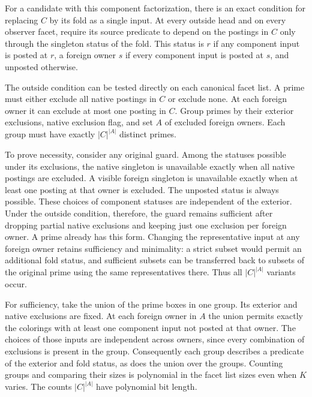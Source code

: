 For a candidate with this component factorization,
there is an exact condition for replacing $C$ by its
fold as a single input. At every outside head and on
every observer facet, require its source predicate
to depend on the postings in $C$ only through the
singleton status of the fold. This status is $r$ if
any component input is posted at $r$, a foreign
owner $s$ if every component input is posted at $s$,
and unposted otherwise.

The outside condition can be tested directly on each
canonical facet list. A prime must either exclude all
native postings in $C$ or exclude none. At each foreign
owner it can exclude at most one posting in $C$.
Group primes by their exterior exclusions, native
exclusion flag, and set $A$ of excluded foreign owners.
Each group must have exactly $|C|^{|A|}$ distinct primes.

To prove necessity, consider any original guard.
Among the statuses possible under its exclusions, the
native singleton is unavailable exactly when all native
postings are excluded. A visible foreign singleton is
unavailable exactly when at least one posting at that
owner is excluded. The unposted status is always
possible. These choices of component statuses are
independent of the exterior. Under the outside
condition, therefore, the guard remains sufficient
after dropping partial native exclusions and keeping
just one exclusion per foreign owner. A prime already
has this form. Changing the representative input at
any foreign owner retains sufficiency and minimality:
a strict subset would permit an additional fold status,
and sufficient subsets can be transferred back to
subsets of the original prime using the same
representatives there. Thus all $|C|^{|A|}$ variants
occur.

For sufficiency, take the union of the prime boxes in
one group. Its exterior and native exclusions are
fixed. At each foreign owner in $A$ the union permits
exactly the colorings with at least one component
input not posted at that owner. The choices of those
inputs are independent across owners, since every
combination of exclusions is present in the group.
Consequently each group describes a predicate of the
exterior and fold status, as does the union over the
groups. Counting groups and comparing their sizes is
polynomial in the facet list sizes even when $K$ varies.
The counts $|C|^{|A|}$ have polynomial bit length.

